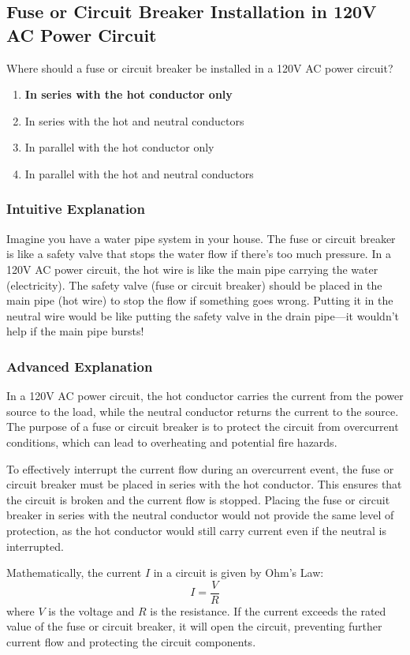 \subsection{Fuse or Circuit Breaker Installation in 120V AC Power Circuit}
\label{T0A08}

\begin{tcolorbox}[colback=gray!10!white,colframe=black!75!black,title=T0A08]
Where should a fuse or circuit breaker be installed in a 120V AC power circuit?
\begin{enumerate}[label=\Alph*]
    \item \textbf{In series with the hot conductor only}
    \item In series with the hot and neutral conductors
    \item In parallel with the hot conductor only
    \item In parallel with the hot and neutral conductors
\end{enumerate}
\end{tcolorbox}

\subsubsection{Intuitive Explanation}
Imagine you have a water pipe system in your house. The fuse or circuit breaker is like a safety valve that stops the water flow if there’s too much pressure. In a 120V AC power circuit, the hot wire is like the main pipe carrying the water (electricity). The safety valve (fuse or circuit breaker) should be placed in the main pipe (hot wire) to stop the flow if something goes wrong. Putting it in the neutral wire would be like putting the safety valve in the drain pipe—it wouldn’t help if the main pipe bursts!

\subsubsection{Advanced Explanation}
In a 120V AC power circuit, the hot conductor carries the current from the power source to the load, while the neutral conductor returns the current to the source. The purpose of a fuse or circuit breaker is to protect the circuit from overcurrent conditions, which can lead to overheating and potential fire hazards. 

To effectively interrupt the current flow during an overcurrent event, the fuse or circuit breaker must be placed in series with the hot conductor. This ensures that the circuit is broken and the current flow is stopped. Placing the fuse or circuit breaker in series with the neutral conductor would not provide the same level of protection, as the hot conductor would still carry current even if the neutral is interrupted.

Mathematically, the current \( I \) in a circuit is given by Ohm's Law:
\[
I = \frac{V}{R}
\]
where \( V \) is the voltage and \( R \) is the resistance. If the current exceeds the rated value of the fuse or circuit breaker, it will open the circuit, preventing further current flow and protecting the circuit components.

